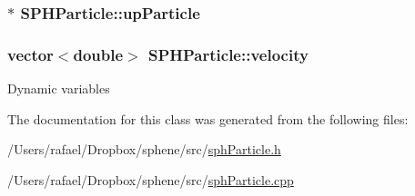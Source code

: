 \subsubsection[{up\+Particle}]{$\ast$ S\+P\+H\+Particle\+::up\+Particle}\label{classSPHParticle_af7b1215febe23bc856039ff338594e9f}
\hypertarget{classSPHParticle_a7fed7ec498a052562a13ec92c3c97178}{}
\subsubsection[{velocity}]{\setlength{\rightskip}{0pt plus 5cm}vector$<$double$>$ S\+P\+H\+Particle\+::velocity}\label{classSPHParticle_a7fed7ec498a052562a13ec92c3c97178}
Dynamic variables 

The documentation for this class was generated from the following files\+:\begin{DoxyCompactItemize}
\item 
/\+Users/rafael/\+Dropbox/sphene/src/\hyperlink{sphParticle_8h}{sph\+Particle.\+h}\item 
/\+Users/rafael/\+Dropbox/sphene/src/\hyperlink{sphParticle_8cpp}{sph\+Particle.\+cpp}\end{DoxyCompactItemize}
